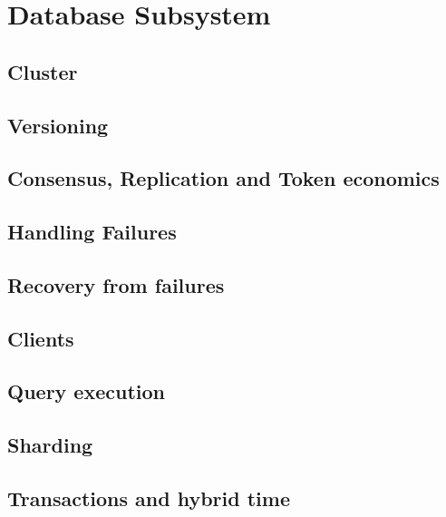 
\section{Database Subsystem}
\subsection{Cluster}
\subsection{Versioning}
\subsection{Consensus, Replication and Token economics}
\subsection{Handling Failures}
\subsection{Recovery from failures}
\subsection{Clients}
\subsection{Query execution}
\subsection{Sharding}
\subsection{Transactions and hybrid time}

